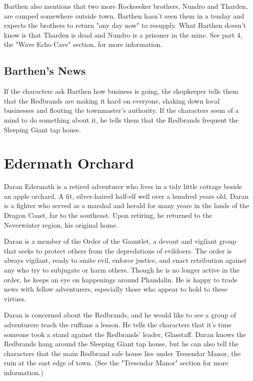 \documentclass[10pt,a4paper,twoside,bg=print,twocolumn,openany,nodeprecatedcode]{dndbook}
\begin{document}
Barthen also mentions that two more Rockseeker brothers, Nundro and Tharden, are camped somewhere outside town. Barthen hasn't seen them in a tenday and expects the brothers to return "any day now" to resupply. What Barthen doesn't know is that Tharden is dead and Nundro is a prisoner in the mine. See part 4, the "Wave Echo Cave" section, for more information.

\subsection{Barthen's News}
If the characters ask Barthen how business is going, the shopkeeper tells them that the Redbrands are making it hard on everyone, shaking down local businesses and flouting the townmaster's authority. If the characters seem of a mind to do something about it, he tells them that the Redbrands frequent the Sleeping Giant tap house.

\section{Edermath Orchard}
Daran Edermath is a retired adventurer who lives in a tidy little cottage beside an apple orchard. A fit, silver-haired half-elf well over a hundred years old, Daran is a fighter who served as a marshal and herald for many years in the lands of the Dragon Coast, far to the southeast. Upon retiring, he returned to the Neverwinter region, his original home.

Daran is a member of the Order of the Gauntlet, a devout and vigilant group that seeks to protect others from the depredations of evildoers. The order is always vigilant, ready to smite evil, enforce justice, and enact retribution against any who try to subjugate or harm others. Though he is no longer active in the order, he keeps an eye on happenings around Phandalin. He is happy to trade news with fellow adventurers, especially those who appear to hold to these virtues.

Daran is concerned about the Redbrands, and he would like to see a group of adventurers teach the ruffians a lesson. He tells the characters that it's time someone took a stand against the Redbrands' leader, Glasstaff. Daran knows the Redbrands hang around the Sleeping Giant tap house, but he can also tell the characters that the main Redbrand safe house lies under Tresendar Manor, the ruin at the east edge of town. (See the "Tresendar Manor" section for more information.)
\end{document}

